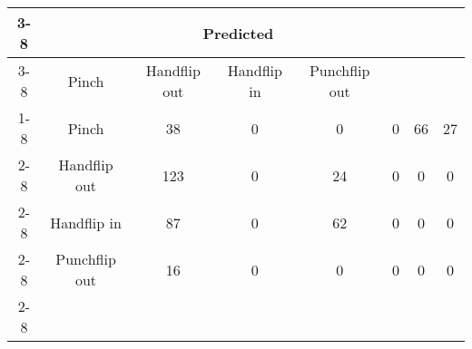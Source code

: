 \documentclass{standalone}
\begin{document}
 
 \begin{tabular}{|c |c |c |c |c |c |c |c |}
\cline{3-8}\multicolumn{2}{c|}{} & \multicolumn{6}{c|}{Predicted} \\ 
\cline{3-8} \multicolumn{2}{c |}{ } & Pinch & Handflip out & Handflip in & Punchflip out\\ 
\cline{1-8}\multirow{6}{*}{\rotatebox[origin=c]{90}{Actual}} & Pinch & 38 & 0 & 0 & 0 & 66 & 27\\ 
 \cline{2-8} & Handflip out & 123 & 0 & 24 & 0 & 0 & 0\\ 
 \cline{2-8} & Handflip in & 87 & 0 & 62 & 0 & 0 & 0\\ 
 \cline{2-8} & Punchflip out & 16 & 0 & 0 & 0 & 0 & 0\\ 
 \cline{2-8}\hline \end{tabular}
 
\end{document}
